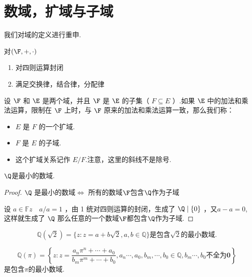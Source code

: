 \section{数域，扩域与子域}
我们对域的定义进行重申.
\begin{definition}
	对$(\F,+,\cdot)$
	\begin{enumerate}
		\item 对四则运算封闭
		
		\item 满足交换律，结合律，分配律
	\end{enumerate}
\end{definition}
\begin{definition}
	设 $\F$ 和 $\E$ 是两个域，并且 $\F$ 是 $\E$ 的子集（ $F \subseteq E$ ）.如果 $\E$ 中的加法和乘法运算，限制在 $\F$ 上时，与 $\F$ 原来的加法和乘法运算一致，那么我们称：
	\begin{itemize}
		\item  $E$ 是 $F$ 的一个扩域.
		\item $F$ 是 $E$ 的子域.
		\item 这个扩域关系记作 $E / F$.注意，这里的斜线不是除号.
	\end{itemize}
	
	
	
\end{definition}


\begin{proposition}
	$\Q$是最小的数域.
\end{proposition}
\begin{proof}
	$\Q$ 是最小的数域$\Leftrightarrow$ 所有的数域$\F$包含$\Q$作为子域
	
	设 $a \in \mathbb{F} z \quad a / a=1$ ，由 1 统对四则运算的封闭，生成了 $\Q\mid\left\{0\right\}$ ，又$ a-a=0$, 这样就生成了 $\Q$
	那么任意的一个数域$\F$都包含$\Q$作为子域.
	
\end{proof}

\begin{example}
	\[\mathbb{Q}(\sqrt{2})=\{z: z=a+b \sqrt{2}, a, b \in \mathbb{Q}\} \textbf{是包含} \sqrt{2}\textbf{的最小数域.} 
	\]
	
	\[\mathbb{Q}(\pi)=\left\{z: z=\frac{a_n \pi^n+\cdots+a_0}{b_m \pi^m+\cdots+b_0}, a_n \cdots, a_0, b_m, \cdots, b_0 \in \mathbb{Q}, b_m \cdots, b_0\textbf{不全为0}\right\}\]
	是包含$\pi$的最小数域.		
\end{example}

